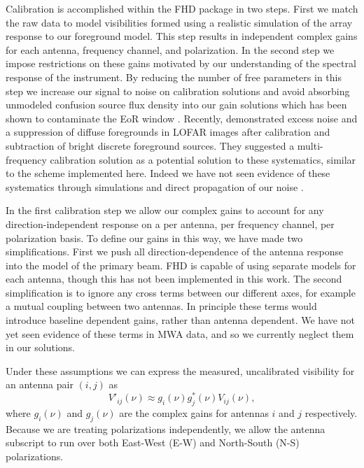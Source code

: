 \documentclass[iop]{emulateapj}
\begin{document}
Calibration is accomplished within the FHD package in two steps. First we match the raw 
data to model visibilities formed using a realistic simulation of the array response to our 
foreground model. This step results in independent complex gains for each antenna, 
frequency channel, and polarization. In the second step we impose restrictions on these 
gains motivated by our understanding of the spectral response of the instrument. By 
reducing the number of free parameters in this step we increase our signal to noise on 
calibration solutions and avoid absorbing unmodeled confusion source flux density into our gain 
solutions which has been shown to contaminate the EoR window \citep{Barry:2016}. 
Recently, \citealt{Patil:2016} demonstrated excess noise and a suppression of diffuse
foregrounds in LOFAR images after calibration and subtraction of bright discrete
foreground sources. They suggested a multi-frequency calibration solution as a potential
solution to these systematics, similar to the scheme implemented here. Indeed we have
not seen evidence of these systematics through simulations and direct propagation of
our noise \citep[Hazelton et al. 2016, in prep.]{Barry:2016}.

In the first calibration step we allow our complex gains to account for any direction-independent 
response on a per antenna, per frequency channel, per polarization basis. To 
define our gains in this way, we have made two simplifications. First we push all 
direction-dependence of the antenna response into the model of the primary beam. FHD is capable 
of using separate models for each antenna, though this has not been implemented in this 
work. The second simplification is to ignore any cross 
terms between our different axes, for example a mutual coupling between two antennas. In 
principle these terms would introduce baseline dependent gains, rather than antenna 
dependent. We have not yet seen evidence of these terms in MWA data, and so we currently 
neglect them in our solutions.

Under these assumptions we can express the measured, uncalibrated visibility for an 
antenna pair $(i,j)$ as
\begin{equation}
V'_{ij}(\nu) \approx g_i(\nu)g^*_j(\nu)V_{ij}(\nu),
\end{equation}
where $g_i(\nu)$ and $g_j(\nu)$ are the complex gains for antennas $i$ and $j$ 
respectively. Because we are treating polarizations independently, we allow the antenna 
subscript to run over both East-West (E-W) and North-South (N-S) polarizations.
\end{document}
